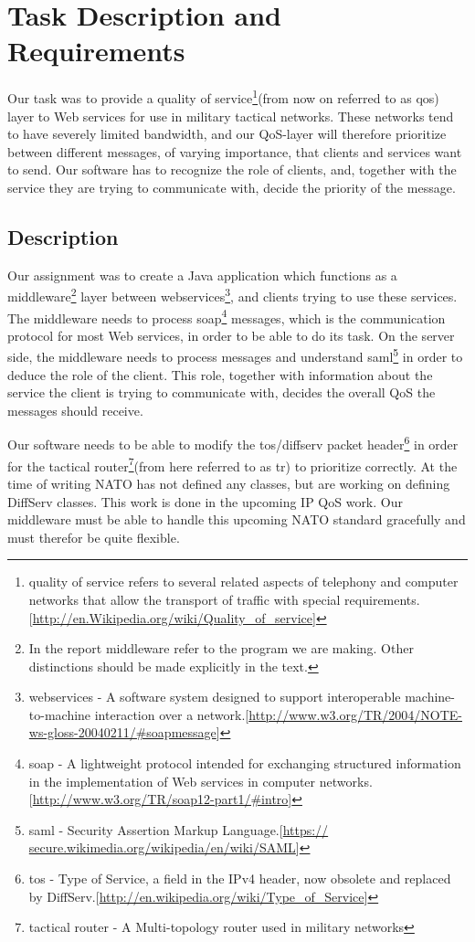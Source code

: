 \section{Task Description and Requirements}\label{Task Description and Requirements} 
    Our task was to provide a \gls{quality of service}\footnote{\gls{quality of service} refers to several related aspects of telephony and computer networks that allow the transport of traffic with special requirements.[\url{http://en.Wikipedia.org/wiki/Quality_of_service}]}(from now on referred to as \gls{qos}) layer to Web services for use in military tactical networks. These networks tend to have severely limited bandwidth, and our QoS-layer will therefore prioritize between different messages, of varying importance, that clients and services want to send. Our software has to recognize the role of clients, and, together with the service they are trying to communicate with, decide the priority of the message.
    
    \subsection{Description}\label{Description}        
    Our assignment was to create a Java application which functions as a \gls{middleware}\footnote{In the report \gls{middleware} refer to the program we are making. Other distinctions should be made explicitly in the text.} layer between \glspl{webservice}\footnote{\glspl{webservice} - A software system designed to support interoperable machine-to-machine interaction over a network.[\url{http://www.w3.org/TR/2004/NOTE-ws-gloss-20040211/\#soapmessage}]}, and clients trying to use these services. The middleware needs to process \gls{soap}\footnote{\gls{soap} - A lightweight protocol intended for exchanging structured information in the implementation of Web services in computer networks.[\url{http://www.w3.org/TR/soap12-part1/\#intro}]} messages, which is the communication protocol for most Web services, in order to be able to do its task. On the server side, the middleware needs to process messages and understand \gls{saml}\footnote{\gls{saml} - Security Assertion Markup Language.[\url{https://
secure.wikimedia.org/wikipedia/en/wiki/SAML}]} in order to deduce the role of the client. This role, together with information about the service the client is trying to communicate with, decides the overall QoS the messages should receive. 

    Our software needs to be able to modify the \gls{tos}/\gls{diffserv} \gls{packet} header\footnote{\gls{tos} - Type of Service, a field in the IPv4 header, now obsolete and replaced by DiffServ.[\url{http://en.wikipedia.org/wiki/Type_of_Service}]} in order for the \Gls{tactical router}\footnote{\Gls{tactical router} - A Multi-topology router used in military networks}(from here referred to as \gls{tr}) to prioritize correctly. At the time of writing NATO has not defined any classes, but are working on defining DiffServ classes. This work is done in the upcoming IP QoS work. Our middleware must be able to handle this upcoming NATO standard gracefully and must therefor be quite flexible.

